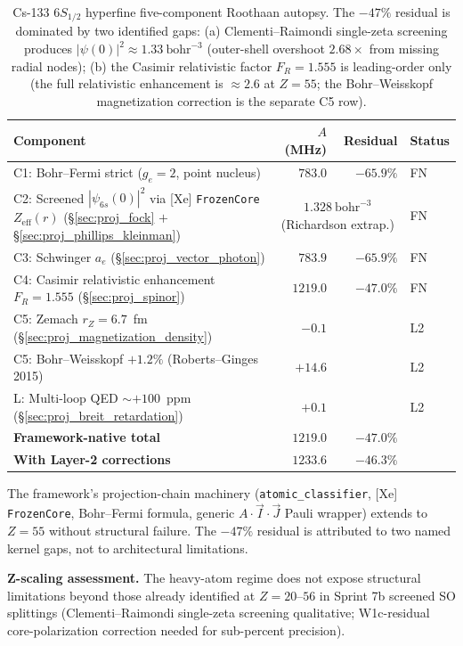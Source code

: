 \documentclass[11pt]{article}
\begin{document}
\begin{table}[h]
\centering\small
\begin{tabular}{p{6.5cm} r r l}
\toprule
Component & $A$ (MHz) & Residual & Status \\
\midrule
C1: Bohr--Fermi strict ($g_e = 2$, point nucleus)
  & $783.0$ & $-65.9\%$ & FN \\
C2: Screened $|\psi_{6s}(0)|^2$ via [Xe] \texttt{FrozenCore}
  $Z_\text{eff}(r)$ (\S\ref{sec:proj_fock} $+$ \S\ref{sec:proj_phillips_kleinman})
  & \multicolumn{2}{c}{$1.328~\text{bohr}^{-3}$ (Richardson extrap.)} & FN \\
C3: Schwinger $a_e$ (\S\ref{sec:proj_vector_photon})
  & $783.9$ & $-65.9\%$ & FN \\
C4: Casimir relativistic enhancement $F_R = 1.555$
  (\S\ref{sec:proj_spinor})
  & $\mathbf{1219.0}$ & $\mathbf{-47.0\%}$ & FN \\
\midrule
C5: Zemach $r_Z = 6.7$~fm (\S\ref{sec:proj_magnetization_density})
  & $-0.1$ & & L2 \\
C5: Bohr--Weisskopf $+1.2\%$ (Roberts--Ginges 2015)
  & $+14.6$ & & L2 \\
L: Multi-loop QED $\sim +100$~ppm (\S\ref{sec:proj_breit_retardation})
  & $+0.1$ & & L2 \\
\midrule
\textbf{Framework-native total} & $\mathbf{1219.0}$ & $\mathbf{-47.0\%}$ & \\
\textbf{With Layer-2 corrections} & $\mathbf{1233.6}$ & $\mathbf{-46.3\%}$ & \\
\bottomrule
\end{tabular}
\caption{Cs-133 $6S_{1/2}$ hyperfine five-component Roothaan autopsy.
The $-47\%$ residual is dominated by two identified gaps:
(a) Clementi--Raimondi single-zeta screening produces
$|\psi(0)|^2 \approx 1.33~\text{bohr}^{-3}$
(outer-shell overshoot $2.68\times$ from missing radial nodes);
(b) the Casimir relativistic factor $F_R = 1.555$ is leading-order only
(the full relativistic enhancement is $\approx 2.6$ at $Z=55$; the
Bohr--Weisskopf magnetization correction is the separate C5 row).}
\label{tab:autopsy_cs_hfs}
\end{table}

The framework's projection-chain machinery (\texttt{atomic\_classifier},
[Xe] \texttt{FrozenCore}, Bohr--Fermi formula, generic
$A \cdot \vec{I} \cdot \vec{J}$ Pauli wrapper) extends to $Z=55$
without structural failure.  The $-47\%$ residual is attributed to two
named kernel gaps, not to architectural limitations.

\textbf{Z-scaling assessment.}  The heavy-atom regime does not expose
structural limitations beyond those already identified at $Z=20$--$56$
in Sprint 7b screened SO splittings (Clementi--Raimondi single-zeta
screening qualitative; W1c-residual core-polarization correction
needed for sub-percent precision).
\end{document}
